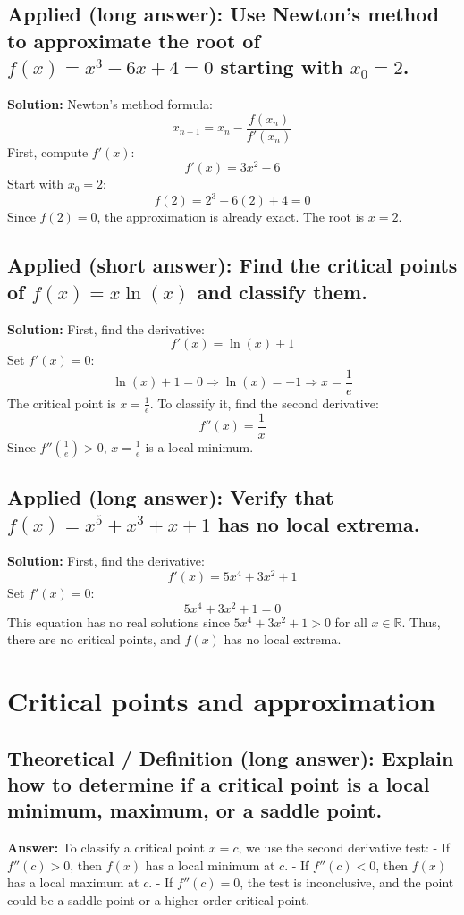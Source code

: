 \documentclass[12pt]{article}
\begin{document}
\subsection{Applied (long answer): Use Newton's method to approximate the root of \( f(x) = x^3 - 6x + 4 = 0 \) starting with \( x_0 = 2 \).}
\textbf{Solution:}
Newton's method formula:
\[
x_{n+1} = x_n - \frac{f(x_n)}{f'(x_n)}
\]
First, compute \( f'(x) \):
\[
f'(x) = 3x^2 - 6
\]
Start with \( x_0 = 2 \):
\[
f(2) = 2^3 - 6(2) + 4 = 0
\]
Since \( f(2) = 0 \), the approximation is already exact. The root is \( x = 2 \).

\subsection{Applied (short answer): Find the critical points of \( f(x) = x\ln(x) \) and classify them.}
\textbf{Solution:}
First, find the derivative:
\[
f'(x) = \ln(x) + 1
\]
Set \( f'(x) = 0 \):
\[
\ln(x) + 1 = 0 \Rightarrow \ln(x) = -1 \Rightarrow x = \frac{1}{e}
\]
The critical point is \( x = \frac{1}{e} \). To classify it, find the second derivative:
\[
f''(x) = \frac{1}{x}
\]
Since \( f''\left(\frac{1}{e}\right) > 0 \), \( x = \frac{1}{e} \) is a local minimum.

\subsection{Applied (long answer): Verify that \( f(x) = x^5 + x^3 + x + 1 \) has no local extrema.}
\textbf{Solution:}
First, find the derivative:
\[
f'(x) = 5x^4 + 3x^2 + 1
\]
Set \( f'(x) = 0 \):
\[
5x^4 + 3x^2 + 1 = 0
\]
This equation has no real solutions since \( 5x^4 + 3x^2 + 1 > 0 \) for all \( x \in \mathbb{R} \). Thus, there are no critical points, and \( f(x) \) has no local extrema.


\section{Critical points and approximation}


\subsection{Theoretical / Definition (long answer): Explain how to determine if a critical point is a local minimum, maximum, or a saddle point.}
\textbf{Answer:} To classify a critical point \( x = c \), we use the second derivative test:
- If \( f''(c) > 0 \), then \( f(x) \) has a local minimum at \( c \).
- If \( f''(c) < 0 \), then \( f(x) \) has a local maximum at \( c \).
- If \( f''(c) = 0 \), the test is inconclusive, and the point could be a saddle point or a higher-order critical point.
\end{document}
